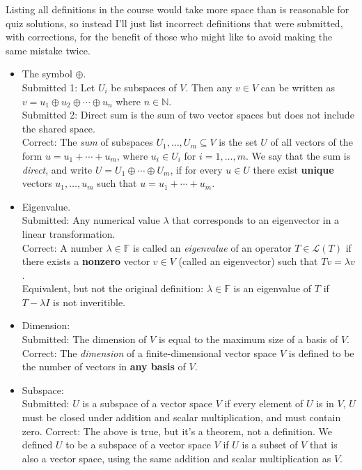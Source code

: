 \documentclass[12pt]{article}
\begin{document}
\begin{enumerate}
Listing all definitions in the course would take more space than is reasonable for quiz solutions, so instead I'll just list incorrect definitions that were submitted, with corrections, for the benefit of those who might like to avoid making the same mistake twice.
\begin{itemize}
 \item The symbol $\oplus$. \\
Submitted 1: Let $U_i$ be subspaces of $V$. Then any $v\in V$ can be written as $v=u_1\oplus u_2\oplus \cdots \oplus u_n$ where $n\in\mathbb{N}$.\\
Submitted 2: Direct sum is the sum of two vector spaces but does not include the shared space.\\
Correct: The {\em sum} of subspaces $U_1,\ldots, U_m\subseteq V$ is the set $U$ of all vectors of the form $u=u_1+\cdots +u_m$, where $u_i\in U_i$ for $i=1,\ldots, m$. We say that the sum is {\em direct}, and write $U=U_1\oplus\cdots\oplus U_m$, if for every $u\in U$ there exist {\bf unique} vectors $u_1,\ldots, u_m$ such that $u=u_1+\cdots +u_m$.
\item Eigenvalue.\\
Submitted: Any numerical value $\lambda$ that corresponds to an eigenvector in a linear transformation.\\
Correct: A number $\lambda\in\mathbb{F}$ is called an {\em eigenvalue} of an operator $T\in\mathcal{L}(T)$ if there exists a {\bf nonzero} vector $v\in V$ (called an eigenvector) such that $Tv=\lambda v$.\\
Equivalent, but not the original definition: $\lambda\in\mathbb{F}$ is an eigenvalue of $T$ if $T-\lambda I$ is not inveritible.
\item Dimension:\\
Submitted: The dimension of $V$ is equal to the maximum size of a basis of $V$.\\
Correct: The {\em dimension} of a finite-dimensional vector space $V$ is defined to be the number of vectors in {\bf any basis} of $V$.
\item Subspace:\\
Submitted: $U$ is a subspace of a vector space $V$ if every element of $U$ is in $V$, $U$ must be closed under addition and scalar multiplication, and must contain zero.
Correct: The above is true, but it's a theorem, not a definition. We defined $U$ to be a subspace of a vector space $V$ if $U$ is a subset of $V$ that is also a vector space, using the same addition and scalar multiplication as $V$.
\end{itemize}

\end{enumerate}
\end{document}
